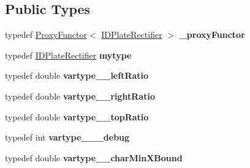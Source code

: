 \subsection*{Public Types}
\begin{DoxyCompactItemize}
\item 
\mbox{\label{classfilter_1_1algos_1_1_i_d_plate_rectifier_a079119de3cda8dfa38a76d06e5ceed8a}} 
typedef \hyperlink{class_proxy_functor}{Proxy\+Functor}$<$ \hyperlink{classfilter_1_1algos_1_1_i_d_plate_rectifier}{I\+D\+Plate\+Rectifier} $>$ {\bfseries \+\_\+proxy\+Functor}
\item 
\mbox{\label{classfilter_1_1algos_1_1_i_d_plate_rectifier_acb4b673e736d6bef78b4128d6432df61}} 
typedef \hyperlink{classfilter_1_1algos_1_1_i_d_plate_rectifier}{I\+D\+Plate\+Rectifier} {\bfseries mytype}
\item 
\mbox{\label{classfilter_1_1algos_1_1_i_d_plate_rectifier_a3fea99ce502904063afbb703d7f47680}} 
typedef double {\bfseries vartype\+\_\+\+\_\+left\+Ratio}
\item 
\mbox{\label{classfilter_1_1algos_1_1_i_d_plate_rectifier_a78876086c5a15b331433ad5a7643f60b}} 
typedef double {\bfseries vartype\+\_\+\+\_\+right\+Ratio}
\item 
\mbox{\label{classfilter_1_1algos_1_1_i_d_plate_rectifier_ae4fec9c71dbaa99898c9657ea38026d0}} 
typedef double {\bfseries vartype\+\_\+\+\_\+top\+Ratio}
\item 
\mbox{\label{classfilter_1_1algos_1_1_i_d_plate_rectifier_ad4b3ccd17d6eda0009ed292dc0b8fa1b}} 
typedef int {\bfseries vartype\+\_\+\+\_\+\+\_\+debug}
\item 
\mbox{\label{classfilter_1_1algos_1_1_i_d_plate_rectifier_a740bc26c7f66d34fb6c3d30024edc094}} 
typedef double {\bfseries vartype\+\_\+\+\_\+char\+Min\+X\+Bound}
\item 
\mbox{\label{classfilter_1_1algos_1_1_i_d_plate_rectifier_a170bf9d9b6f9f4aa1dc30d0a4dfc0d03}} 

\end{DoxyCompactItemize}
